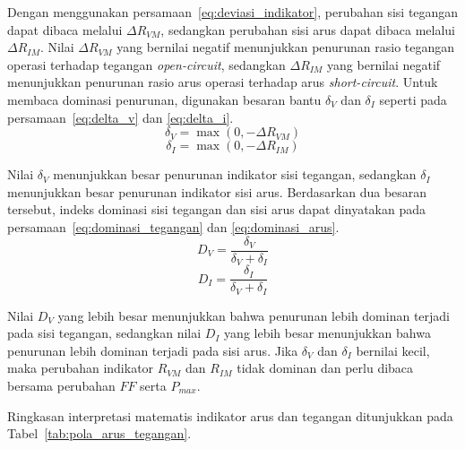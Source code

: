 Dengan menggunakan persamaan~\eqref{eq:deviasi_indikator}, perubahan sisi
tegangan dapat dibaca melalui $\Delta R_{VM}$, sedangkan perubahan sisi arus
dapat dibaca melalui $\Delta R_{IM}$. Nilai $\Delta R_{VM}$ yang bernilai
negatif menunjukkan penurunan rasio tegangan operasi terhadap tegangan
\textit{open-circuit}, sedangkan $\Delta R_{IM}$ yang bernilai negatif
menunjukkan penurunan rasio arus operasi terhadap arus \textit{short-circuit}.
Untuk membaca dominasi penurunan, digunakan besaran bantu $\delta_V$ dan
$\delta_I$ seperti pada persamaan~\eqref{eq:delta_v} dan
\eqref{eq:delta_i}.
\begin{equation}
\delta_V = \max(0,-\Delta R_{VM})
\label{eq:delta_v}
\end{equation}
\begin{equation}
\delta_I = \max(0,-\Delta R_{IM})
\label{eq:delta_i}
\end{equation}

Nilai $\delta_V$ menunjukkan besar penurunan indikator sisi tegangan, sedangkan
$\delta_I$ menunjukkan besar penurunan indikator sisi arus. Berdasarkan dua
besaran tersebut, indeks dominasi sisi tegangan dan sisi arus dapat dinyatakan
pada persamaan~\eqref{eq:dominasi_tegangan} dan
\eqref{eq:dominasi_arus}.
\begin{equation}
D_V =
\frac{\delta_V}{\delta_V+\delta_I}
\label{eq:dominasi_tegangan}
\end{equation}
\begin{equation}
D_I =
\frac{\delta_I}{\delta_V+\delta_I}
\label{eq:dominasi_arus}
\end{equation}

Nilai $D_V$ yang lebih besar menunjukkan bahwa penurunan lebih dominan terjadi
pada sisi tegangan, sedangkan nilai $D_I$ yang lebih besar menunjukkan bahwa
penurunan lebih dominan terjadi pada sisi arus. Jika $\delta_V$ dan $\delta_I$
bernilai kecil, maka perubahan indikator $R_{VM}$ dan $R_{IM}$ tidak dominan
dan perlu dibaca bersama perubahan $FF$ serta $P_{max}$.

Ringkasan interpretasi matematis indikator arus dan tegangan ditunjukkan pada
Tabel~\ref{tab:pola_arus_tegangan}.

